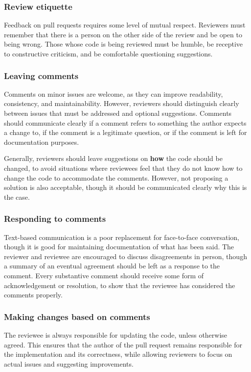 \documentclass[12pt,a4paper]{article}
\begin{document}
        \subsubsection{Review etiquette}
            Feedback on pull requests requires some level of mutual respect. Reviewers must remember that there is a person on the other side of the review and be open to being wrong. Those whose code is being reviewed must be humble, be receptive to constructive criticism, and be comfortable questioning suggestions.

        \subsubsection{Leaving comments}
            Comments on minor issues are welcome, as they can improve readability, consistency, and maintainability. However, reviewers should distinguish clearly between issues that must be addressed and optional suggestions. Comments should communicate clearly if a comment refers to something the author expects a change to, if the comment is a legitimate question, or if the comment is left for documentation purposes.

            Generally, reviewers should leave suggestions on \textbf{how} the code should be changed, to avoid situations where reviewees feel that they do not know how to change the code to accommodate the comments. However, not proposing a solution is also acceptable, though it should be communicated clearly why this is the case.

        \subsubsection{Responding to comments}
            Text-based communication is a poor replacement for face-to-face conversation, though it is good for maintaining documentation of what has been said. The reviewer and reviewee are encouraged to discuss disagreements in person, though a summary of an eventual agreement should be left as a response to the comment. Every substantive comment should receive some form of acknowledgement or resolution, to show that the reviewee has considered the comments properly.

        \subsubsection{Making changes based on comments}
            The reviewee is always responsible for updating the code, unless otherwise agreed. This ensures that the author of the pull request remains responsible for the implementation and its correctness, while allowing reviewers to focus on actual issues and suggesting improvements.
\end{document}
